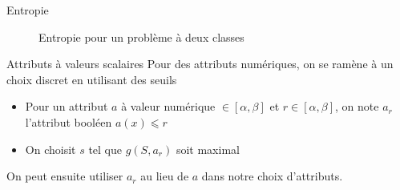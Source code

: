\documentclass[../allslides.tex]{subfiles}
\begin{document}
\begin{frame}{Entropie}
    \begin{figure}
        \tikzset{external/export=true}
        \caption{Entropie pour un problème à deux classes}
    \end{figure}
\end{frame}

\begin{frame}{Attributs à valeurs scalaires}
    Pour des attributs numériques, on se ramène à un choix discret en utilisant des seuils
    \begin{itemize}
        \item Pour un attribut \(a\) à valeur numérique \(∈[α, β]\) et \(r∈[α, β]\), on note \(a_r\) l'attribut booléen \(a(x)⩽r\)
        \item On choisit \(s\) tel que \(g(S, a_r)\) soit maximal
    \end{itemize}
    On peut ensuite utiliser \(a_r\) au lieu de \(a\) dans notre choix d'attributs.
\end{frame}
\end{document}
